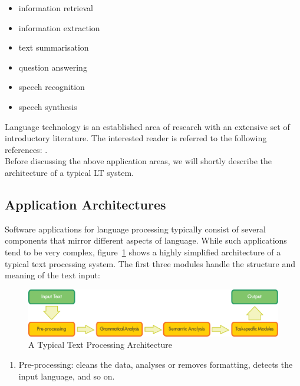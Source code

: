 \begin{multicols}{2}
\begin{itemize}
\item information retrieval

\item information extraction

\item text summarisation

\item question answering

\item speech recognition

\item speech synthesis
\end{itemize}

Language technology is an established area of research with an extensive set of introductory literature. The interested reader is referred to the following references:  \cite{carstensen-etal1, jurafsky-martin01, manning-schuetze1, lt-world1, lt-survey1}.\\
Before discussing the above application areas, we will shortly
describe the architecture of a typical LT system.

\subsection{Application Architectures}

Software applications for language processing typically consist of
several components that mirror different aspects of language. 
While such applications tend to be very complex, figure~\ref{fig:textprocessingarch-eng} shows a highly simplified architecture of a typical text processing system. The first three modules handle the structure and meaning of the text input:

\begin{figure}[b]
  \center
  \includegraphics[width=\textwidth]{../_media/english/text_processing_app_architecture}
  \caption{A Typical Text Processing Architecture}
  \label{fig:textprocessingarch-eng}
\end{figure}

\begin{enumerate}
\item Pre-processing: cleans the data, analyses or removes formatting,
detects the input language, and so on.


\end{enumerate}
\end{multicols}
